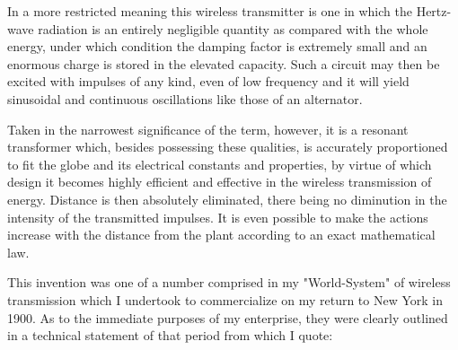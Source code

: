 \documentclass[a4paper,12pt,english,twoside,openright]{memoir}
\begin{document}
In a more restricted meaning this wireless transmitter is one in which the Hertz-wave radiation is 
an entirely negligible quantity as compared with the whole energy, under which condition the 
damping factor is extremely small and an enormous charge is stored in the elevated capacity.  
Such a circuit may then be excited with impulses of any kind, even of low frequency and it will 
yield sinusoidal and continuous oscillations like those of an alternator.  

Taken in the narrowest significance of the term, however, it is a resonant transformer which, 
besides possessing these qualities, is accurately proportioned to fit the globe and its electrical 
constants and properties, by virtue of which design it becomes highly efficient and effective in the 
wireless transmission of energy.  Distance is then absolutely eliminated, there being no 
diminution in the intensity of the transmitted impulses.  It is even possible to make the actions 
increase with the distance from the plant according to an exact mathematical law.  

This invention was one of a number comprised in my "World-System" of wireless transmission 
which I undertook to commercialize on my return to New York in 1900.  As to the immediate 
purposes of my enterprise, they were clearly outlined in a technical statement of that period from 
which I quote: 
\end{document}
